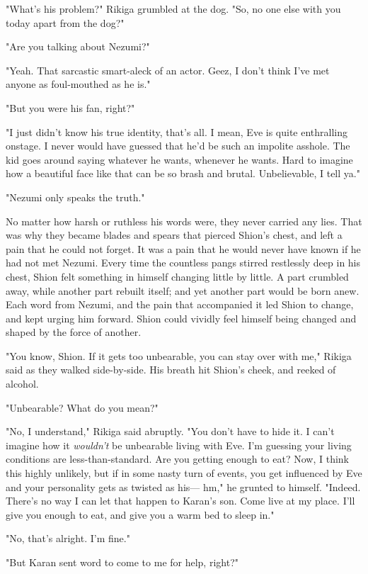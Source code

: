 "What's his problem?" Rikiga grumbled at the dog. "So, no one else with
you today apart from the dog?"

"Are you talking about Nezumi?"

"Yeah. That sarcastic smart-aleck of an actor. Geez, I don't think I've
met anyone as foul-mouthed as he is."

"But you were his fan, right?"

"I just didn't know his true identity, that's all. I mean, Eve is quite
enthralling onstage. I never would have guessed that he'd be such an
impolite asshole. The kid goes around saying whatever he wants, whenever
he wants. Hard to imagine how a beautiful face like that can be so brash
and brutal. Unbelievable, I tell ya."

"Nezumi only speaks the truth."

No matter how harsh or ruthless his words were, they never carried any
lies. That was why they became blades and spears that pierced Shion's
chest, and left a pain that he could not forget. It was a pain that he
would never have known if he had not met Nezumi. Every time the
countless pangs stirred restlessly deep in his chest, Shion felt
something in himself changing little by little. A part crumbled away,
while another part rebuilt itself; and yet another part would be born
anew. Each word from Nezumi, and the pain that accompanied it led Shion
to change, and kept urging him forward. Shion could vividly feel himself
being changed and shaped by the force of another.

"You know, Shion. If it gets too unbearable, you can stay over with me,"
Rikiga said as they walked side-by-side. His breath hit Shion's cheek,
and reeked of alcohol.

"Unbearable? What do you mean?"

"No, I understand," Rikiga said abruptly. "You don't have to hide it. I
can't imagine how it \emph{wouldn't} be unbearable living with Eve. I'm
guessing your living conditions are less-than-standard. Are you getting
enough to eat? Now, I think this highly unlikely, but if in some nasty
turn of events, you get influenced by Eve and your personality gets as
twisted as his--- hm," he grunted to himself. "Indeed. There's no way I
can let that happen to Karan's son. Come live at my place. I'll give you
enough to eat, and give you a warm bed to sleep in."

"No, that's alright. I'm fine."

"But Karan sent word to come to me for help, right?"

